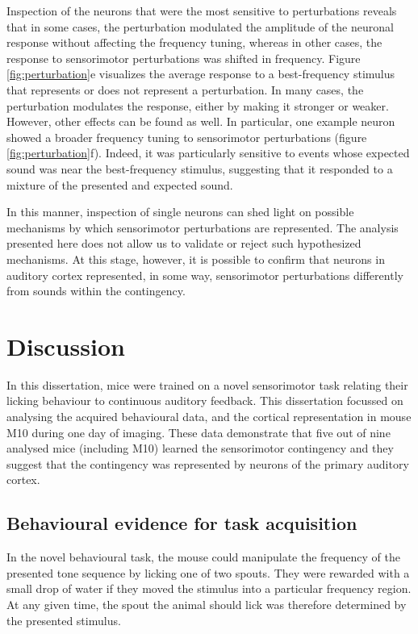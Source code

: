 \documentclass[]{report}
\theoremstyle{definition}
\theoremstyle{definition}
\theoremstyle{definition}
\theoremstyle{remark}
\begin{document}
Inspection of the neurons that were the most sensitive to perturbations
reveals that in some cases, the perturbation modulated the amplitude of
the neuronal response without affecting the frequency tuning, whereas in
other cases, the response to sensorimotor perturbations was shifted in
frequency. Figure \ref{fig:perturbation}e visualizes the average
response to a best-frequency stimulus that represents or does not
represent a perturbation. In many cases, the perturbation modulates the
response, either by making it stronger or weaker. However, other effects
can be found as well. In particular, one example neuron showed a broader
frequency tuning to sensorimotor perturbations (figure
\ref{fig:perturbation}f). Indeed, it was particularly sensitive to
events whose expected sound was near the best-frequency stimulus,
suggesting that it responded to a mixture of the presented and expected
sound.

In this manner, inspection of single neurons can shed light on possible
mechanisms by which sensorimotor perturbations are represented. The
analysis presented here does not allow us to validate or reject such
hypothesized mechanisms. At this stage, however, it is possible to
confirm that neurons in auditory cortex represented, in some way,
sensorimotor perturbations differently from sounds within the
contingency.

\hypertarget{discussion}{%
\chapter{Discussion}\label{discussion}}

In this dissertation, mice were trained on a novel sensorimotor task
relating their licking behaviour to continuous auditory feedback. This
dissertation focussed on analysing the acquired behavioural data, and
the cortical representation in mouse M10 during one day of imaging.
These data demonstrate that five out of nine analysed mice (including
M10) learned the sensorimotor contingency and they suggest that the
contingency was represented by neurons of the primary auditory cortex.

\hypertarget{behavioural-evidence-for-task-acquisition}{%
\section{Behavioural evidence for task
acquisition}\label{behavioural-evidence-for-task-acquisition}}

In the novel behavioural task, the mouse could manipulate the frequency
of the presented tone sequence by licking one of two spouts. They were
rewarded with a small drop of water if they moved the stimulus into a
particular frequency region. At any given time, the spout the animal
should lick was therefore determined by the presented stimulus.
\end{document}
